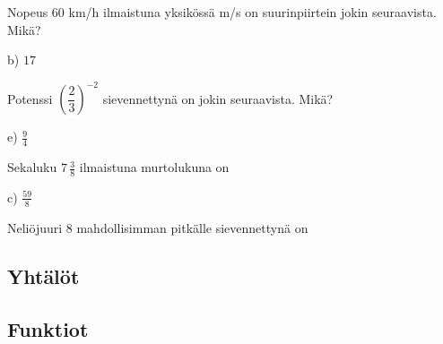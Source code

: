 \begin{tehtava}
Nopeus 60 km/h ilmaistuna yksikössä m/s on suurinpiirtein jokin seuraavista. Mikä?
\begin{alakohdat}
\end{alakohdat}
	\begin{vastaus}
	 b) $17$
	\end{vastaus}
\end{tehtava}

\begin{tehtava}
Potenssi $\left( \dfrac{2}{3} \right)^{-2}$ sievennettynä on jokin seuraavista. Mikä?
\begin{alakohdat}
\end{alakohdat}
\begin{vastaus}
e) $\frac{9}{4}$
\end{vastaus}
\end{tehtava}

\begin{tehtava}
Sekaluku $7\,\frac{3}{8}$ ilmaistuna murtolukuna on
\begin{alakohdat}
\end{alakohdat}
    \begin{vastaus}
	 c) $\frac{59}{8}$
    \end{vastaus}
\end{tehtava}

\begin{tehtava}
Neliöjuuri 8 mahdollisimman pitkälle sievennettynä on
\begin{alakohdat}
\end{alakohdat}
\end{tehtava}

\subsection*{Yhtälöt}

\subsection*{Funktiot}

\newpage